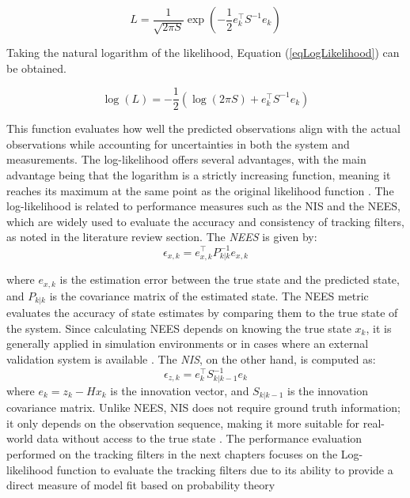 \begin{equation}
    L = \frac{1}{\sqrt{2\pi S}} \exp\left( -\frac{1}{2} e_k^\top S^{-1} e_k \right)
    \label{eqLikelihood}
\end{equation}

Taking the natural logarithm of the likelihood, Equation (\ref{eqLogLikelihood}) can be obtained.

\begin{equation}
    \log(L) = -\frac{1}{2} \left( \log(2\pi S) + e_k^\top S^{-1} e_k \right)
    \label{eqLogLikelihood}
\end{equation}

This function evaluates how well the predicted observations align with the actual observations while accounting for uncertainties in both the system and measurements. The log-likelihood offers several advantages, with the main advantage being that the logarithm is a strictly increasing function, meaning it reaches its maximum at the same point as the original likelihood function \cite{labbe2014kalman}.
\newline
\newline
The log-likelihood is related to performance measures such as the \ac{NIS} and the \ac{NEES}, which are widely used to evaluate the accuracy and consistency of tracking filters, as noted in the literature review section.
\newline
The \textit{NEES} is given by:
\begin{equation}
    \epsilon_{x,k} = e_{x,k}^\top P^{-1}_{k|k} e_{x,k}
\end{equation}

where \( e_{x,k} \) is the estimation error between the true state and the predicted state, and \( P_{k|k} \) is the covariance matrix of the estimated state. The \ac{NEES} metric evaluates the accuracy of state estimates by comparing them to the true state of the system. Since calculating \ac{NEES} depends on knowing the true state \( x_k \), it is generally applied in simulation environments or in cases where an external validation system is available \cite{chen2024kalman}.
\newline
The \textit{NIS}, on the other hand, is computed as:
\begin{equation}
    \epsilon_{z,k} = e_k^\top S^{-1}_{k|k-1} e_k
\end{equation}
where \( e_k = z_k - Hx_k \) is the innovation vector, and \( S_{k|k-1} \) is the innovation covariance matrix. Unlike \ac{NEES}, \ac{NIS} does not require ground truth information; it only depends on the observation sequence, making it more suitable for real-world data without access to the true state \cite{chen2018weak}. The performance evaluation performed on the tracking filters in the next chapters focuses on the Log-likelihood function to evaluate the tracking filters due to its ability to provide a direct measure of model fit based on probability theory




